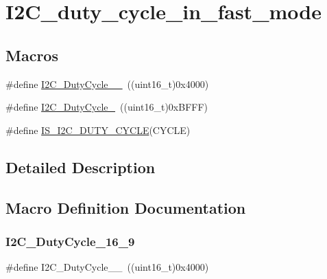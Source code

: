\hypertarget{group___i2_c__duty__cycle__in__fast__mode}{}\section{I2\+C\+\_\+duty\+\_\+cycle\+\_\+in\+\_\+fast\+\_\+mode}
\label{group___i2_c__duty__cycle__in__fast__mode}
\subsection*{Macros}
\begin{DoxyCompactItemize}
\item 
\#define \mbox{\hyperlink{group___i2_c__duty__cycle__in__fast__mode_ga2b4ff186808a8095fc2d1b8193f30ce1}{I2\+C\+\_\+\+Duty\+Cycle\+\_\+\_}}~((uint16\+\_\+t)0x4000)
\item 
\#define \mbox{\hyperlink{group___i2_c__duty__cycle__in__fast__mode_gafe0af31970aceef0fa8df6a10bef35db}{I2\+C\+\_\+\+Duty\+Cycle\+\_}}~((uint16\+\_\+t)0x\+B\+F\+F\+F)
\item 
\#define \mbox{\hyperlink{group___i2_c__duty__cycle__in__fast__mode_gae9b3276d9b6ec872ee4fafa2b2fafb83}{I\+S\+\_\+\+I2\+C\+\_\+\+D\+U\+T\+Y\+\_\+\+C\+Y\+C\+LE}}(C\+Y\+C\+LE)
\end{DoxyCompactItemize}


\subsection{Detailed Description}


\subsection{Macro Definition Documentation}
\mbox{\label{group___i2_c__duty__cycle__in__fast__mode_ga2b4ff186808a8095fc2d1b8193f30ce1}} 
\subsubsection{\texorpdfstring{I2C\_DutyCycle\_16\_9}{I2C\_DutyCycle\_16\_9}}
{\footnotesize\ttfamily \#define I2\+C\+\_\+\+Duty\+Cycle\+\_\+\_~((uint16\+\_\+t)0x4000)}

